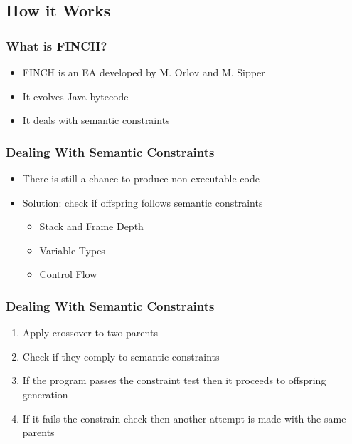 \documentclass{beamer}
\begin{document}
\subsection[How it works]{How it Works}
\begin{frame}
	\frametitle{What is FINCH?}
	\begin{itemize}
		\item FINCH is an EA developed by M. Orlov and M. Sipper	
		\item It evolves Java bytecode
		\item It deals with semantic constraints
	\end{itemize}
\end{frame}

\begin{frame}
  \frametitle{Dealing With Semantic Constraints}

  \begin{itemize}
  	\item There is still a chance to produce non-executable code
	\item Solution: check if offspring follows semantic constraints
	\\
	\begin{itemize}
	\item Stack and Frame Depth
	\item Variable Types
	\item Control Flow
	\end{itemize}

  \end{itemize}
\end{frame}

\begin{frame}
\frametitle{Dealing With Semantic Constraints}
\begin{enumerate}
\item Apply crossover to two parents
\item Check if they comply to semantic constraints
\item If the program passes the constraint test then it proceeds to offspring generation
\item If it fails the constrain check then another attempt is made with the same parents
\end{enumerate}

\end{frame}
\end{document}
